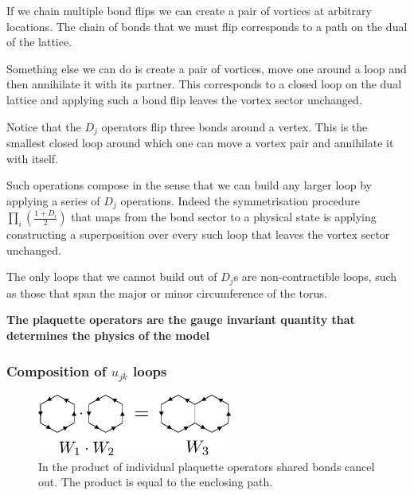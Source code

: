 If we chain multiple bond flips we can create a pair of vortices at arbitrary locations. The chain of bonds that we must flip corresponds to a path on the dual of the lattice.

Something else we can do is create a pair of vortices, move one around a loop and then annihilate it with its partner. This corresponds to a closed loop on the dual lattice and applying such a bond flip leaves the vortex sector unchanged.

Notice that the \(D_j\) operators flip three bonds around a vertex. This is the smallest closed loop around which one can move a vortex pair and annihilate it with itself.

Such operations compose in the sense that we can build any larger loop by applying a series of \(D_j\) operations. Indeed the symmetrisation procedure \(\prod_i \left( \frac{1 + D_i}{2}\right)\) that maps from the bond sector to a physical state is applying constructing a superposition over every such loop that leaves the vortex sector unchanged.

The only loops that we cannot build out of \(D_j\)s are non-contractible loops, such as those that span the major or minor circumference of the torus.

\textbf{The plaquette operators are the gauge invariant quantity that determines the physics of the model}

\hypertarget{composition-of-u_jk-loops}{%
\subsubsection{\texorpdfstring{Composition of \(u_{jk}\) loops}{Composition of u\_\{jk\} loops}}\label{composition-of-u_jk-loops}}

\begin{figure}
\hypertarget{fig:plaquette_addition_by_hand}{%
\centering
\includegraphics[width=0.57\textwidth,height=\textheight]{figure_code/amk_chapter/plaquette_addition/plaquette_addition_by_hand.pdf}
\caption{In the product of individual plaquette operators shared bonds cancel out. The product is equal to the enclosing path.}\label{fig:plaquette_addition_by_hand}
}
\end{figure}

